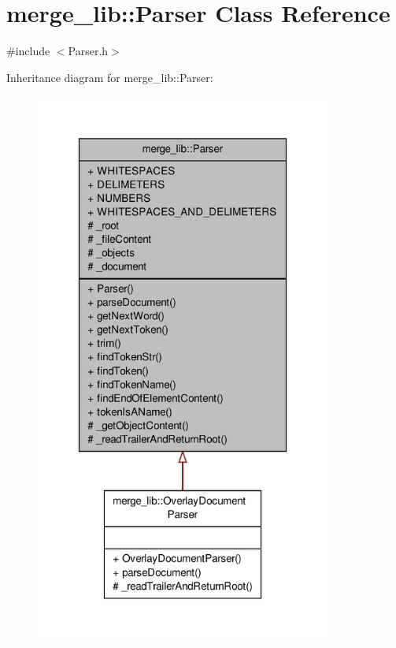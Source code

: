 \hypertarget{classmerge__lib_1_1_parser}{\section{merge\-\_\-lib\-:\-:Parser Class Reference}
\label{d4/de3/classmerge__lib_1_1_parser}
}


{\ttfamily \#include $<$Parser.\-h$>$}



Inheritance diagram for merge\-\_\-lib\-:\-:Parser\-:
\nopagebreak
\begin{figure}[H]
\begin{center}
\leavevmode
\includegraphics[width=276pt]{d4/dd5/classmerge__lib_1_1_parser__inherit__graph}
\end{center}
\end{figure}


